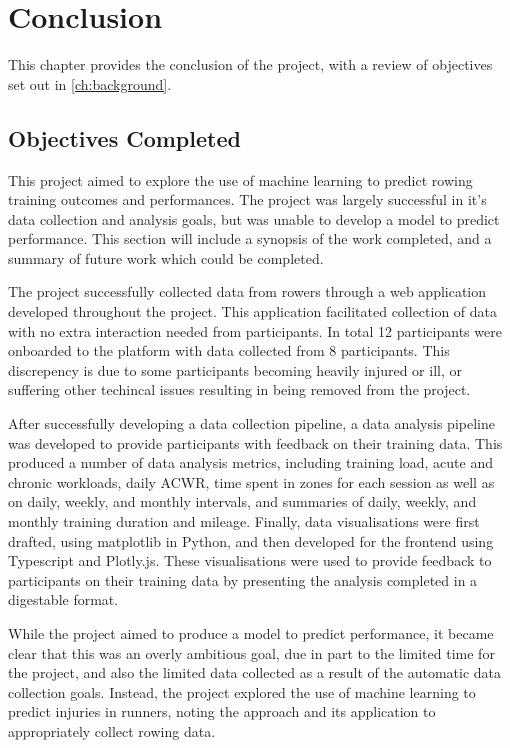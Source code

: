 \chapter{Conclusion}
This chapter provides the conclusion of the project, with a review of objectives set out in \ref{ch:background}.


\section{Objectives Completed}
This project aimed to explore the use of machine learning to predict rowing training outcomes and performances. The project was largely successful in it's data collection and analysis goals, but was unable to develop a model to predict performance. This section will include a synopsis of the work completed, and a summary of future work which could be completed. 

The project successfully collected data from rowers through a web application developed throughout the project. This application facilitated collection of data with no extra interaction needed from participants. In total 12 participants were onboarded to the platform with data collected from 8 participants. This discrepency is due to some participants becoming heavily injured or ill, or suffering other techincal issues resulting in being removed from the project. 

After successfully developing a data collection pipeline, a data analysis pipeline was developed to provide participants with feedback on their training data. This produced a number of data analysis metrics, including training load, acute and chronic workloads, daily ACWR, time spent in zones for each session as well as on daily, weekly, and monthly intervals, and summaries of daily, weekly, and monthly training duration and mileage. Finally, data visualisations were first drafted, using matplotlib in Python, and then developed for the frontend using Typescript and Plotly.js. These visualisations were used to provide feedback to participants on their training data by presenting the analysis completed in a digestable format.

While the project aimed to produce a model to predict performance, it became clear that this was an overly ambitious goal, due in part to the limited time for the project, and also the limited data collected as a result of the automatic data collection goals. Instead, the project explored the use of machine learning to predict injuries in runners, noting the approach and its application to appropriately collect rowing data.


